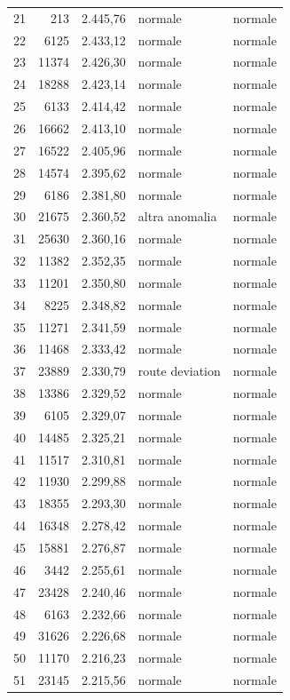 {\begin{longtable}{rrrll}
21 & 213 & 2.445,76 & normale & normale \\
22 & 6125 & 2.433,12 & normale & normale \\
23 & 11374 & 2.426,30 & normale & normale \\
24 & 18288 & 2.423,14 & normale & normale \\
25 & 6133 & 2.414,42 & normale & normale \\
26 & 16662 & 2.413,10 & normale & normale \\
27 & 16522 & 2.405,96 & normale & normale \\
28 & 14574 & 2.395,62 & normale & normale \\
29 & 6186 & 2.381,80 & normale & normale \\
30 & 21675 & 2.360,52 & altra anomalia & normale \\
31 & 25630 & 2.360,16 & normale & normale \\
32 & 11382 & 2.352,35 & normale & normale \\
33 & 11201 & 2.350,80 & normale & normale \\
34 & 8225 & 2.348,82 & normale & normale \\
35 & 11271 & 2.341,59 & normale & normale \\
36 & 11468 & 2.333,42 & normale & normale \\
37 & 23889 & 2.330,79 & route deviation & normale \\
38 & 13386 & 2.329,52 & normale & normale \\
39 & 6105 & 2.329,07 & normale & normale \\
40 & 14485 & 2.325,21 & normale & normale \\
41 & 11517 & 2.310,81 & normale & normale \\
42 & 11930 & 2.299,88 & normale & normale \\
43 & 18355 & 2.293,30 & normale & normale \\
44 & 16348 & 2.278,42 & normale & normale \\
45 & 15881 & 2.276,87 & normale & normale \\
46 & 3442 & 2.255,61 & normale & normale \\
47 & 23428 & 2.240,46 & normale & normale \\
48 & 6163 & 2.232,66 & normale & normale \\
49 & 31626 & 2.226,68 & normale & normale \\
50 & 11170 & 2.216,23 & normale & normale \\
51 & 23145 & 2.215,56 & normale & normale \\

\end{longtable}}
